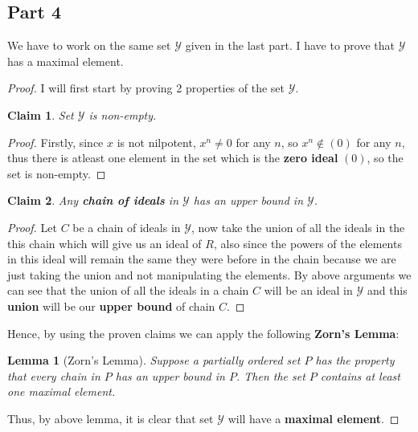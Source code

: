 \documentclass{article}
\let\bold\textbf
\newtheorem{lemma}{Lemma}[section]
\newtheorem{claim}{Claim}[subsection]
\begin{document}
{  \subsection{Part 4}{
    We have to work on the same set $\mathcal{Y}$ given in the last part. \newline
    I have to prove that $\mathcal{Y}$ has a maximal element.
    \begin{proof}
      I will first start by proving 2 properties of the set $\mathcal{Y}$.
    \begin{claim}
      Set $\mathcal{Y}$ is non-empty.
    \end{claim}
    \begin{proof}
      Firstly, since $x$ is not nilpotent, $x^n \neq 0$ for any $n$, so $x^n \notin (0)$ for any $n$, thus there is atleast one element in the set which is the \bold{zero ideal} $(0)$, so the set is non-empty.
    \end{proof}
    \begin{claim}
      Any \bold{chain of ideals} in $\mathcal{Y}$ has an upper bound in $\mathcal{Y}$.
    \end{claim}
    \begin{proof}
      Let $C$ be a chain of ideals in $\mathcal{Y}$, now take the union of all the ideals in the this chain which will give us an ideal of $R$, also since the powers of the elements in this ideal will remain the same they were before in the chain because we are just taking the union and not manipulating the elements. \newline
      By above arguments we can see that the union of all the ideals in a chain $C$ will be an ideal in $\mathcal{Y}$ and this \bold{union} will be our \bold{upper bound} of chain $C$.
    \end{proof}
    Hence, by using the proven claims we can apply the following \bold{Zorn's Lemma}:
    \begin{lemma}[Zorn's Lemma]
      Suppose a partially ordered set $P$ has the property that every chain in $P$ has an upper bound in $P$. Then the set $P$ contains at least one maximal element.
    \end{lemma}
    Thus, by above lemma, it is clear that set $\mathcal{Y}$ will have a \bold{maximal element}.
  \end{proof}
  }
}
\end{document}
